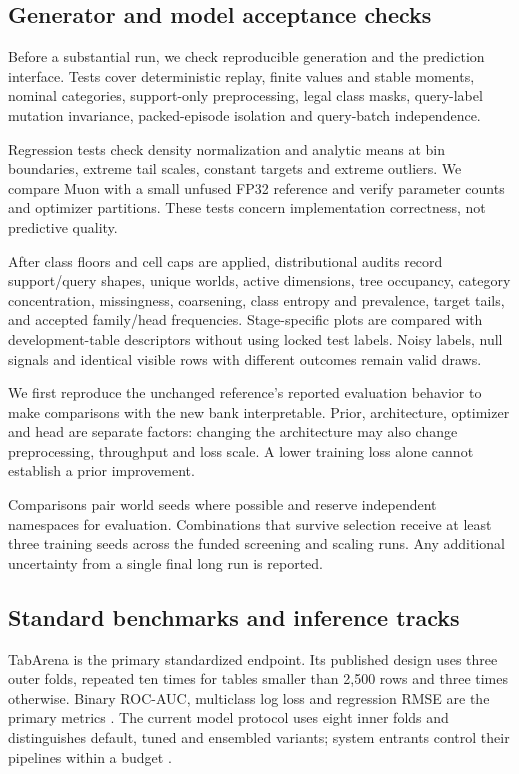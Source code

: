 \documentclass[11pt]{article}
\begin{document}
\subsection{Generator and model acceptance checks}

Before a substantial run, we check reproducible generation and the prediction interface. Tests cover deterministic replay, finite values and stable moments, nominal categories, support-only preprocessing, legal class masks, query-label mutation invariance, packed-episode isolation and query-batch independence.

Regression tests check density normalization and analytic means at bin boundaries, extreme tail scales, constant targets and extreme outliers. We compare Muon with a small unfused FP32 reference and verify parameter counts and optimizer partitions. These tests concern implementation correctness, not predictive quality.

After class floors and cell caps are applied, distributional audits record support/query shapes, unique worlds, active dimensions, tree occupancy, category concentration, missingness, coarsening, class entropy and prevalence, target tails, and accepted family/head frequencies. Stage-specific plots are compared with development-table descriptors without using locked test labels. Noisy labels, null signals and identical visible rows with different outcomes remain valid draws.

We first reproduce the unchanged reference's reported evaluation behavior to make comparisons with the new bank interpretable. Prior, architecture, optimizer and head are separate factors: changing the architecture may also change preprocessing, throughput and loss scale. A lower training loss alone cannot establish a prior improvement.

Comparisons pair world seeds where possible and reserve independent namespaces for evaluation. Combinations that survive selection receive at least three training seeds across the funded screening and scaling runs. Any additional uncertainty from a single final long run is reported.

\subsection{Standard benchmarks and inference tracks}

TabArena is the primary standardized endpoint. Its published design uses three outer folds, repeated ten times for tables smaller than 2,500 rows and three times otherwise. Binary ROC-AUC, multiclass log loss and regression RMSE are the primary metrics \cite{tabarena}. The current model protocol uses eight inner folds and distinguishes default, tuned and ensembled variants; system entrants control their pipelines within a budget \cite{tabarena-code}.
\end{document}
